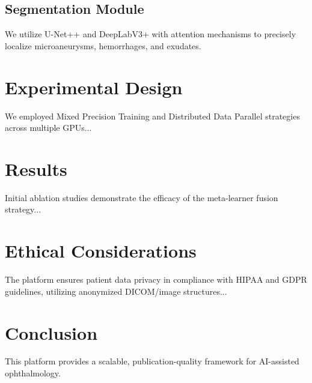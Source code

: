 \documentclass[10pt,journal,compsoc]{IEEEtran}
\begin{document}
\subsection{Segmentation Module}
We utilize U-Net++ and DeepLabV3+ with attention mechanisms to precisely localize microaneurysms, hemorrhages, and exudates.

\section{Experimental Design}
We employed Mixed Precision Training and Distributed Data Parallel strategies across multiple GPUs...

\section{Results}
Initial ablation studies demonstrate the efficacy of the meta-learner fusion strategy...

\section{Ethical Considerations}
The platform ensures patient data privacy in compliance with HIPAA and GDPR guidelines, utilizing anonymized DICOM/image structures...

\section{Conclusion}
This platform provides a scalable, publication-quality framework for AI-assisted ophthalmology.
\end{document}
